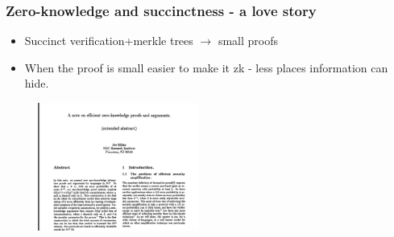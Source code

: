 \documentclass[shadesubsections,compress,14pt,mathserif]{beamer}
\begin{document}
\begin{frame}
 \frametitle{Zero-knowledge and succinctness - a love story}
\begin{itemize}
 \item Succinct verification+merkle trees $\rightarrow$ small proofs
 \item When the proof is small easier to make it zk - less places information can hide.
\end{itemize}
 
 \begin{figure}
  \includegraphics[width=150pt]{kilian.png}
\end{figure}
\end{frame}
\end{document}
